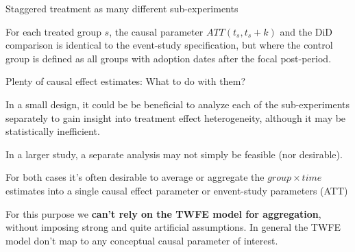 \documentclass[notes,11pt, aspectratio=169]{beamer}
\newenvironment{wideitemize}{\itemize\addtolength{\itemsep}{10pt}}{\enditemize}
\begin{document}
\begin{frame}{Staggered treatment as many different sub-experiments}
      \begin{wideitemize}
          \item For each treated group $s$, the causal parameter $ATT(t_s,t_s+k)$ and the DiD comparison is identical to the event-study specification, but where the control group is defined as all groups with adoption dates after the focal post-period.
          \item Plenty of causal effect estimates: What to do with them? 
         \begin{wideitemize}
          \item In a small design, it could be be beneficial to analyze each of the sub-experiments separately to gain insight into treatment effect heterogeneity, although it may be statistically inefficient.
          \item In a larger study, a separate analysis may not simply be feasible (nor desirable). 
          \end{wideitemize} 
          \item For both cases it's often desirable to average or aggregate the $group\times time$ estimates into a single causal effect parameter or envent-study parameters (ATT)  
          \item For this purpose we\textbf{ can't rely on the TWFE model for aggregation}, without imposing strong and quite artificial assumptions. In general the TWFE model don't map to any conceptual causal parameter of interest.
      \end{wideitemize}
\end{frame}
\end{document}
